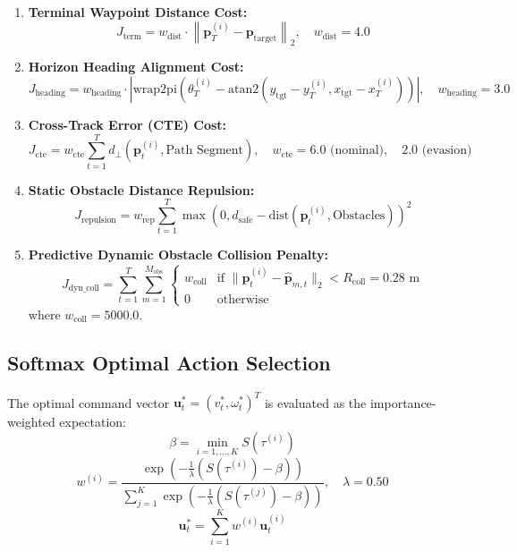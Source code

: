 \documentclass[10pt,a4paper]{article}
\begin{document}
\begin{enumerate}
    \item \textbf{Terminal Waypoint Distance Cost:}
    \begin{equation}
    J_{\text{term}} = w_{\text{dist}} \cdot \left\| \mathbf{p}_T^{(i)} - \mathbf{p}_{\text{target}} \right\|_2, \quad w_{\text{dist}} = 4.0
    \end{equation}
    \item \textbf{Horizon Heading Alignment Cost:}
    \begin{equation}
    J_{\text{heading}} = w_{\text{heading}} \cdot \left| \text{wrap2pi}\left(\theta_T^{(i)} - \text{atan2}(y_{\text{tgt}} - y_T^{(i)}, x_{\text{tgt}} - x_T^{(i)})\right) \right|, \quad w_{\text{heading}} = 3.0
    \end{equation}
    \item \textbf{Cross-Track Error (CTE) Cost:}
    \begin{equation}
    J_{\text{cte}} = w_{\text{cte}} \sum_{t=1}^T d_{\perp}(\mathbf{p}_t^{(i)}, \text{Path Segment}), \quad w_{\text{cte}} = 6.0 \text{ (nominal)}, \quad 2.0 \text{ (evasion)}
    \end{equation}
    \item \textbf{Static Obstacle Distance Repulsion:}
    \begin{equation}
    J_{\text{repulsion}} = w_{\text{rep}} \sum_{t=1}^T \max\left(0, d_{\text{safe}} - \text{dist}(\mathbf{p}_t^{(i)}, \text{Obstacles})\right)^2
    \end{equation}
    \item \textbf{Predictive Dynamic Obstacle Collision Penalty:}
    \begin{equation}
    J_{\text{dyn\_coll}} = \sum_{t=1}^T \sum_{m=1}^{M_{\text{obs}}} \begin{cases} 
    w_{\text{coll}} & \text{if } \|\mathbf{p}_t^{(i)} - \hat{\mathbf{p}}_{m, t}\|_2 < R_{\text{coll}} = 0.28\text{ m} \\
    0 & \text{otherwise}
    \end{cases}
    \end{equation}
    where $w_{\text{coll}} = 5000.0$.
\end{enumerate}

\subsection{Softmax Optimal Action Selection}
The optimal command vector $\mathbf{u}_t^* = (v_t^*, \omega_t^*)^T$ is evaluated as the importance-weighted expectation:
\begin{equation}
\beta = \min_{i=1,\dots,K} S(\tau^{(i)})
\end{equation}
\begin{equation}
w^{(i)} = \frac{\exp\left(-\frac{1}{\lambda} (S(\tau^{(i)}) - \beta)\right)}{\sum_{j=1}^K \exp\left(-\frac{1}{\lambda} (S(\tau^{(j)}) - \beta)\right)}, \quad \lambda = 0.50
\end{equation}
\begin{equation}
\mathbf{u}_t^* = \sum_{i=1}^K w^{(i)} \mathbf{u}_t^{(i)}
\end{equation}
\end{document}
